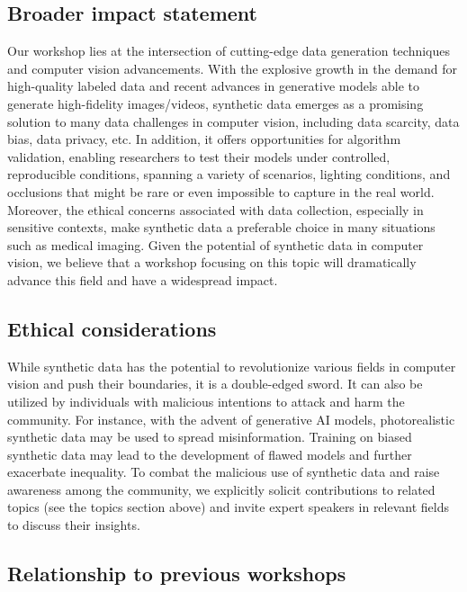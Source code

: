 \documentclass{article}
\begin{document}
\subsection{Broader impact statement}

Our workshop lies at the intersection of cutting-edge data generation techniques and computer vision advancements. With the explosive growth in the demand for high-quality labeled data and recent advances in generative models able to generate high-fidelity images/videos, synthetic data emerges as a promising solution to many data challenges in computer vision, including data scarcity, data bias, data privacy, etc. 
In addition, it offers opportunities for algorithm validation, enabling researchers to test their models under controlled, reproducible conditions, spanning a variety of scenarios, lighting conditions, and occlusions that might be rare or even impossible to capture in the real world. Moreover, the ethical concerns associated with data collection, especially in sensitive contexts, make synthetic data a preferable choice in many situations such as medical imaging.
Given the potential of synthetic data in computer vision, we believe that a workshop focusing on this topic will dramatically advance this field and have a widespread impact.

\subsection{Ethical considerations}
While synthetic data has the potential to revolutionize various fields in computer vision and push their boundaries, it is a double-edged sword. It can also be utilized by individuals with malicious intentions to attack and harm the community. For instance, with the advent of generative AI models, photorealistic synthetic data may be used to spread misinformation. Training on biased synthetic data may lead to the development of flawed models and further exacerbate inequality. To combat the malicious use of synthetic data and raise awareness among the community, we explicitly solicit contributions to related topics (see the topics section above) and invite expert speakers in relevant fields to discuss their insights.

\subsection{Relationship to previous workshops}
\end{document}
